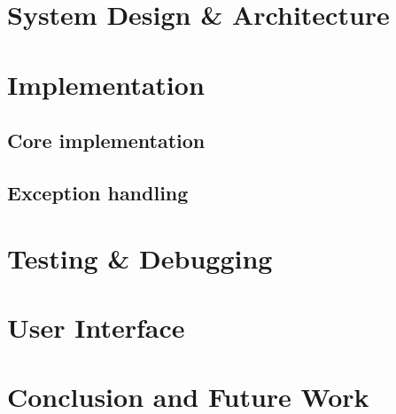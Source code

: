 \documentclass[11pt]{article}
\begin{document}
	\newpage
	
	\section{System Design \& Architecture}
	\lipsum[1-4]
	
	\newpage
	
	\section{Implementation}
	\lipsum[1-4]
	
	\subsection{Core implementation}
	\lipsum[1-2]
	
	\subsection{Exception handling}
	\lipsum[1-2]
	
	\newpage
	
	\section{Testing \& Debugging}
	\lipsum[1-4]
	
	\newpage
	
	\section{User Interface}
	\lipsum[1-4]
	
	\newpage
	
	\section{Conclusion and Future Work}
	\lipsum[1-4]
	
	\newpage
	\printbibliography
\end{document}
